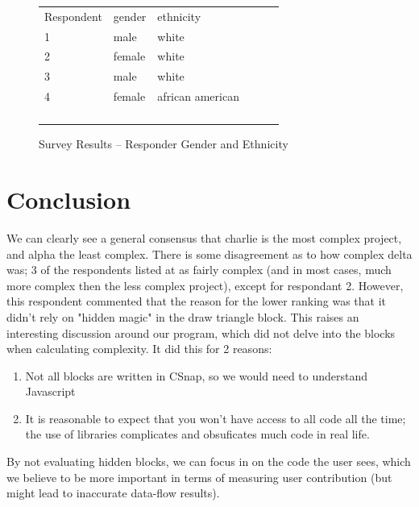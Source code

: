 \documentclass[]{article}
\begin{document}
\begin{figure}[fh!]
	\caption{Survey Results -- Responder Gender and Ethnicity}
	\label{survey-results-gender}
	\centering
\begin{tabular}{llllll}
Respondent & gender & ethnicity        &  &  &  \\
1          & male   & white            &  &  &  \\
2          & female & white            &  &  &  \\
3          & male   & white            &  &  &  \\
4          & female & african american &  &  &  \\
           &        &                  &  &  &  \\
           &        &                  &  &  &  \\
           &        &                  &  &  &  \\
           &        &                  &  &  & 
\end{tabular}
\end{figure}

\section{Conclusion}

We can clearly see a general consensus that charlie is the most complex project, and alpha the least complex.
There is some disagreement as to how complex delta was; 3 of the respondents listed at as fairly complex (and in most cases, much more complex then the less complex project), except for respondant 2.
However, this respondent commented that the reason for the lower ranking was that it didn't rely on "hidden magic" in the draw triangle block.
This raises an interesting discussion around our program, which did not delve into the blocks when calculating complexity.
It did this for 2 reasons:
\begin{enumerate}
	\item Not all blocks are written in CSnap, so we would need to understand Javascript
	\item It is reasonable to expect that you won't have access to all code all the time; the use of libraries complicates and obsuficates much code in real life.
\end{enumerate}

By not evaluating hidden blocks, we can focus in on the code the user sees, which we believe to be more important in terms of measuring user contribution (but might lead to inaccurate data-flow results).
\end{document}
